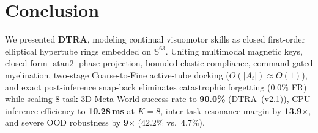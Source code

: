 \documentclass[10pt,twocolumn]{article}
\begin{document}
\section{Conclusion}

We presented \textbf{DTRA}, modeling continual visuomotor skills as closed first-order elliptical hypertube rings embedded on $\mathbb{S}^{63}$. Uniting multimodal magnetic keys, closed-form $\operatorname{atan2}$ phase projection, bounded elastic compliance, command-gated myelination, two-stage Coarse-to-Fine active-tube docking ($O(|A_t|)\approx O(1)$), and exact post-inference snap-back eliminates catastrophic forgetting ($0.0\%$ FR) while scaling 8-task 3D Meta-World success rate to \textbf{90.0\%} (DTRA~(v2.1)), CPU inference efficiency to \textbf{10.28\,ms} at $K=8$, inter-task resonance margin by \textbf{13.9$\times$}, and severe OOD robustness by \textbf{9$\times$} ($42.2\%$ vs.\ $4.7\%$).
\end{document}
